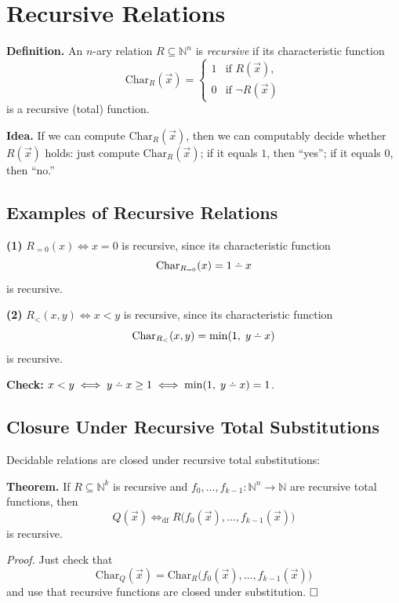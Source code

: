 \documentclass[11pt]{article}
\newcommand{\dotminus}{\mathbin{\ooalign{\hidewidth\raise0.5ex\hbox{$\cdot$}\hidewidth\cr$-$\cr}}}
\begin{document}
\section{Recursive Relations}

\textbf{Definition.} An $n$-ary relation $R \subseteq \mathbb{N}^n$ is \emph{recursive} if its characteristic function
\[
    \mathrm{Char}_R(\vec{x}) = \begin{cases} 1 & \text{if } R(\vec{x}), \\ 0 & \text{if } \neg R(\vec{x}) \end{cases}
\]
is a recursive (total) function.

\textbf{Idea.} If we can compute $\mathrm{Char}_R(\vec{x})$, then we can computably decide whether $R(\vec{x})$ holds: just compute $\mathrm{Char}_R(\vec{x})$; if it equals $1$, then ``yes''; if it equals $0$, then ``no.''

\subsection{Examples of Recursive Relations}

\textbf{(1)} $R_{=0}(x) \iff x = 0$ is recursive, since its characteristic function
\[
    \mathrm{Char}_{R_{=0}}(x) = 1 \dotminus x
\]
is recursive.

\textbf{(2)} $R_{<}(x, y) \iff x < y$ is recursive, since its characteristic function
\[
    \mathrm{Char}_{R_{<}}(x, y) = \min(1,\; y \dotminus x)
\]
is recursive.

\textbf{Check:} $x < y \iff y \dotminus x \ge 1 \iff \min(1,\; y \dotminus x) = 1$.

\subsection{Closure Under Recursive Total Substitutions}

Decidable relations are closed under recursive total substitutions:

\textbf{Theorem.} If $R \subseteq \mathbb{N}^k$ is recursive and $f_0, \dots, f_{k-1}\colon \mathbb{N}^n \to \mathbb{N}$ are recursive total functions, then
\[
    Q(\vec{x}) \iff_{\mathrm{df}} R\bigl(f_0(\vec{x}), \dots, f_{k-1}(\vec{x})\bigr)
\]
is recursive.

\textit{Proof.} Just check that
\[
    \mathrm{Char}_Q(\vec{x}) = \mathrm{Char}_R\bigl(f_0(\vec{x}), \dots, f_{k-1}(\vec{x})\bigr)
\]
and use that recursive functions are closed under substitution. $\hfill\square$
\end{document}
